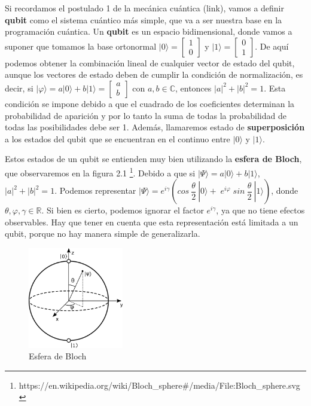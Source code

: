  Si recordamos el postulado 1 de la mecánica cuántica (link), vamos a definir \textbf{qubit} como el sistema cuántico más simple, que va a ser nuestra base en la programación cuántica. Un \textbf{qubit} es un espacio bidimensional, donde vamos a suponer que tomamos la base ortonormal $|0 \rangle = \begin{bmatrix} 1\\0 \end{bmatrix}$ y $|1 \rangle = \begin{bmatrix} 0\\1 \end{bmatrix}$. De aquí podemos obtener la combinación lineal de cualquier vector de estado del qubit, aunque los vectores de estado deben de cumplir la condición de normalización, es decir, si $|\varphi \rangle = a |0\rangle + b |1\rangle = \begin{bmatrix} a\\b \end{bmatrix}$ con $a,b \in \mathbb{C}$, entonces $|a|^{2}+|b|^{2}=1$. Esta condición se impone debido a que el cuadrado de los coeficientes determinan la probabilidad de aparición y por lo tanto la suma de todas la probabilidad de todas las posibilidades debe ser 1. Además, llamaremos estado de \textbf{superposición} a los estados del qubit que se encuentran en el continuo entre $|0\rangle$ y $|1\rangle$.\newline

 Estos estados de un qubit se entienden muy bien utilizando la \textbf{esfera de Bloch}, que observaremos en la figura 2.1 \footnote{https://en.wikipedia.org/wiki/Bloch\_sphere#/media/File:Bloch\_sphere.svg}. Debido a que si $|\Psi \rangle = a |0\rangle + b |1\rangle$, $|a|^{2}+|b|^{2}=1$. Podemos representar $|\Psi \rangle = e^{i\gamma}\left( cos\:\dfrac{\theta}{2} \:|0\rangle +\; e^{i\varphi}\;sin\:\dfrac{\theta}{2}\:|1\rangle\right)$, donde $\theta,\varphi,\gamma \in \mathbb{R}$. Si bien es cierto, podemos ignorar el factor $e^{i\gamma}$, ya que no tiene efectos observables. Hay que tener en cuenta que esta representación está limitada a un qubit, porque no hay manera simple de generalizarla.

  \begin{figure}[H]
    \centering
    \includegraphics[width=0.37\textwidth]{TFG/imagenes/Bloch_sphere.png}
    \caption{Esfera de Bloch} 
  \end{figure}
 
